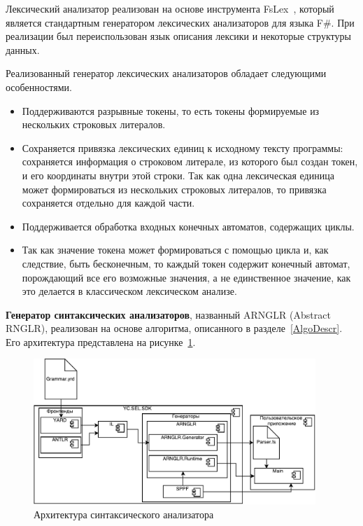 Лексический анализатор реализован на основе инструмента FsLex~\cite{FsLex}, который является стандартным генератором лексических анализаторов для языка F\#. При реализации был переиспользован язык описания лексики и некоторые структуры данных.

Реализованный генератор лексических анализаторов обладает следующими особенностями.
\begin{itemize}
    \item Поддерживаются разрывные токены, то есть токены формируемые из нескольких строковых литералов.
    \item Сохраняется привязка лексических единиц к исходному тексту программы: сохраняется информация о строковом литерале, из которого был создан токен, и его координаты внутри этой строки. Так как одна лексическая единица может формироваться из нескольких строковых литералов, то привязка сохраняется отдельно для каждой части.
    \item Поддерживается обработка входных конечных автоматов, содержащих циклы.
    \item Так как значение токена может формироваться с помощью цикла и, как следствие, быть бесконечным, то каждый токен содержит конечный автомат, порождающий все его возможные значения, а не единственное значение, как это делается в классическом лексическом анализе.
\end{itemize}

\textbf{Генератор синтаксических анализаторов}, названный ARNGLR (Abstract RNGLR), реализован на основе алгоритма, описанного в разделе~\ref{AlgoDescr}. Его архитектура представлена на рисунке~\ref{fig:ParsArch}.  

\begin{figure}[h!]
\begin{center}
\includegraphics[width=0.95\textwidth]{pics/ARNGLRArch}
\caption{Архитектура синтаксического анализатора}
\label{fig:ParsArch} 
\end{center}
\end{figure}

